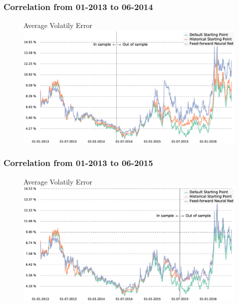 \documentclass[bigger]{beamer}
\begin{document}
\begin{frame}
\frametitle{Correlation from 01-2013 to 06-2014}
  \justifying
\begin{figure}[h]
\centering
   Average Volatily Error\\
   \includegraphics[width=\textwidth]{Graphics/adj_error_insample40_s150k_d20_vola_error_fnn.eps}
\end{figure}
\end{frame}

\begin{frame}
\frametitle{Correlation from 01-2013 to 06-2015}
  \justifying
\begin{figure}[h]
\centering
   Average Volatily Error\\
   \includegraphics[width=\textwidth]{Graphics/adj_error_insample73_s150k_d20_vola_error_fnn.eps}
\end{figure}
\end{frame}
\end{document}
